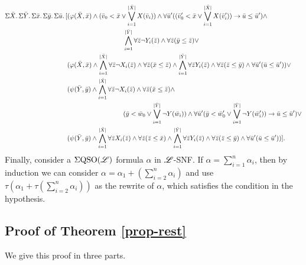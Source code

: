 \begin{align*}
\sa{\bar{X}}\sa{\bar{Y}}\sa{\bar{x}}\sa{\bar{y}}\sa{\bar{u}}[&(\varphi(\bar{X},\bar{x})\wedge(\bar{v}_0 < \bar{x} \vee \bigvee_{i = 1}^{\length{\bar{X}}}X(\bar{v}_i))\wedge \forall\bar{u}'((\bar{v}_0' < \bar{x} \vee \bigvee_{i = 1}^{\length{\bar{X}}}X(\bar{v}_i'))\to\bar{u}\leq\bar{u}') \wedge \\
& \hspace{3cm}  \bigwedge_{i = 1}^{\length{\bar{Y}}} \forall\bar{z}\neg Y_i(\bar{z}) \wedge \forall\bar{z}(\bar{y}\leq\bar{z})\vee\\
&
(\varphi(\bar{X},\bar{x})\wedge\bigwedge_{i = 1}^{\length{\bar{X}}} \forall\bar{z}\neg X_i(\bar{z}) \wedge \forall\bar{z}(\bar{x}\leq\bar{z})\wedge\bigwedge_{i = 1}^{\length{\bar{Y}}} \forall\bar{z} Y_i(\bar{z}) \wedge \forall\bar{z}(\bar{z}\leq\bar{y})\wedge\forall\bar{u}'(\bar{u}\leq\bar{u}'))\vee
\\
&(\psi(\bar{Y},\bar{y})\wedge\bigwedge_{i = 1}^{\length{\bar{X}}} \forall\bar{z}\neg X_i(\bar{z}) \wedge \forall\bar{z}(\bar{x}\leq\bar{z})\wedge \\
& \hspace{3cm} (\bar{y} < \bar{w}_0 \vee \bigvee_{i = 1}^{\length{\bar{Y}}}\neg Y(\bar{w}_i))\wedge\forall\bar{u}'(\bar{y} < \bar{w}_0' \vee \bigvee_{i = 1}^{\length{\bar{Y}}}\neg Y(\bar{w}_i'))\to\bar{u}\leq\bar{u}')\vee \\
&(\psi(\bar{Y},\bar{y})\wedge\bigwedge_{i = 1}^{\length{\bar{X}}} \forall\bar{z} X_i(\bar{z}) \wedge \forall\bar{z}(\bar{z}\leq\bar{x})\wedge\bigwedge_{i = 1}^{\length{\bar{Y}}} \forall\bar{z} Y_i(\bar{z}) \wedge \forall\bar{z}(\bar{z}\leq\bar{y})\wedge\forall\bar{u}'(\bar{u}\leq\bar{u}'))].
\end{align*}
Finally, consider a $\Sigma{\rm QSO}(\mathscr{L})$ formula $\alpha$ in $\mathscr{L}$-SNF. If $\alpha = \sum_{i = 1}^n\alpha_i$, then by induction we can consider $\alpha = \alpha_1 + (\sum_{i = 2}^n\alpha_i)$ and use $\tau(\alpha_1 + \tau(\sum_{i = 2}^n\alpha_i))$ as the rewrite of $\alpha$, which satisfies the condition in the hypothesis.










\subsection*{Proof of Theorem \ref{prop-rest}}
We give this proof in three parts.

